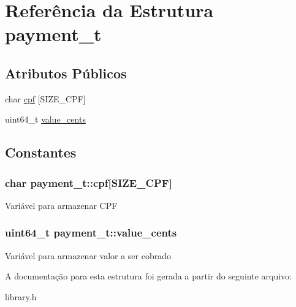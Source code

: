 \hypertarget{structpayment__t}{
\section{Referência da Estrutura payment\_\-t}
\label{structpayment__t}
}
\subsection*{Atributos Públicos}
\begin{DoxyCompactItemize}
\item 
char \hyperlink{structpayment__t_a182c15a67689a1de360f2971d18c9ca0}{cpf} \mbox{[}SIZE\_\-CPF\mbox{]}
\item 
uint64\_\-t \hyperlink{structpayment__t_acf3634a53a7462e91a6d9bb6ea0db2ce}{value\_\-cents}
\end{DoxyCompactItemize}


\subsection{Constantes}
\hypertarget{structpayment__t_a182c15a67689a1de360f2971d18c9ca0}{
\subsubsection[{cpf}]{\setlength{\rightskip}{0pt plus 5cm}char {\bf payment\_\-t::cpf}\mbox{[}SIZE\_\-CPF\mbox{]}}}
\label{structpayment__t_a182c15a67689a1de360f2971d18c9ca0}
Variável para armazenar CPF \hypertarget{structpayment__t_acf3634a53a7462e91a6d9bb6ea0db2ce}{
\subsubsection[{value\_\-cents}]{\setlength{\rightskip}{0pt plus 5cm}uint64\_\-t {\bf payment\_\-t::value\_\-cents}}}
\label{structpayment__t_acf3634a53a7462e91a6d9bb6ea0db2ce}
Variável para armazenar valor a ser cobrado 

A documentação para esta estrutura foi gerada a partir do seguinte arquivo:\begin{DoxyCompactItemize}
\item 
library.h\end{DoxyCompactItemize}

